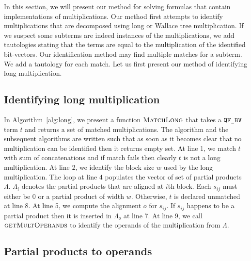 %
In this section, we will present our method for solving
formulas that contain implementations of multiplications.
%
Our method first attempts to identify multiplications that
are decomposed using long or Wallace tree multiplication.
%
If we suspect some subterms are indeed instances of the
multiplications, we add tautologies stating that the terms are 
equal to the multiplication of the identified bit-vectors.
%
Our identification method may find multiple matches for a subterm.
%
We add a tautology for each match.
%
Let us first present our method of identifying long multiplication. 


\subsection{Identifying long multiplication}


In Algorithm~\ref{alg:long}, we present a function $\textsc{MatchLong}$
that takes a $\texttt{QF\_BV}$ term $t$ and returns a set of matched multiplications.
%
The algorithm and the subsequent algorithms are written such that as soon
as it becomes clear that no multiplication can be identified then
it returns empty set. 
%
At line 1, we match $t$ with sum of concatenations and if match fails
then clearly $t$ is not a long multiplication.
%
At line 2, we identify the block size $w$ used by the long
multiplication.
%
The loop at line $4$ populates the vector of set of partial products $\Lambda$.
%
$\Lambda_i$ denotes the partial products that are aligned at $i$th block.
%
Each $s_{ij}$ must either be $0$ or a partial product of width $w$.
%
Otherwise, $t$ is declared unmatched at line 8. 
%
At line 5, we compute the alignment $o$ for $s_{ij}$.
%
If $s_{ij}$ happens to be a partial product then it is inserted in
$\Lambda_o$ at line 7.
%
At line 9, we call $\textsc{getMultOperands}$ to identify the operands
of the multiplication from $\Lambda$.

\subsection{Partial products to operands}


